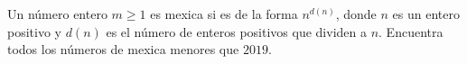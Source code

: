 Un número entero $m\geq 1$ es mexica si es de la forma $n^{d(n)}$, donde $n$ es un entero positivo y $d(n)$ es el número de enteros positivos que dividen a $n$. Encuentra todos los números de mexica menores que $2019$.